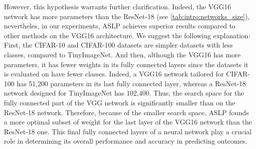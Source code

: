 However, this hypothesis warrants further clarification. Indeed, the VGG16
network has more parameters than the ResNet-18 (see
\cref{tab:intro:networks_size}), nevertheles, in our experiments, \ac{ASLP}
achieves superior results compared to other methods on the VGG16 architecture.
We suggest the following explanation: First, the CIFAR-10 and CIFAR-100 datasets
are simpler datasets with less classes, compared to TinyImageNet. And then,
although the VGG16 has more parameters, it has fewer weights in its fully
connected layers since the datasets it is evaluated on have fewer classes.
Indeed, a VGG16 network tailored for CIFAR-100 has 51,200 parameters in its last
fully connected layer, whereas a ResNet-18 network designed for TinyImageNet has
102,400. Thus, the search space for the fully connected part of the VGG network
is significantly smaller than on the ResNet-18 network. Therefore, because of
the smaller search space, \ac{ASLP} founds a more optimal subset of weight for
the last layer of the VGG16 network than the ResNet-18 one. This final fully
connected layers of a neural network play a crucial role in determining its
overall performance and accuracy in predicting outcomes.\\







